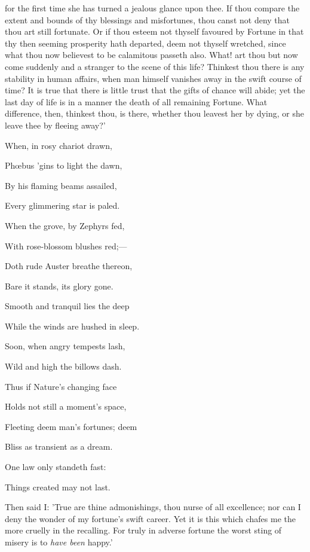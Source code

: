 for the first time she has turned a jealous glance upon thee. If thou
compare the extent and bounds of thy blessings and misfortunes, thou
canst not deny that thou art still fortunate. Or if thou esteem not
thyself favoured by Fortune in that thy then seeming prosperity hath
departed, deem not thyself wretched, since what thou now believest to be
calamitous passeth also. What! art thou but now come suddenly and a
stranger to the scene of this life? Thinkest thou there is any stability
in human affairs, when man himself vanishes away in the swift course of
time? It is true that there is little trust that the gifts of chance
will abide; yet the last day of life is in a manner the death of all
remaining Fortune. What difference, then, thinkest thou, is there,
whether thou leavest her by dying, or she leave thee by fleeing away?'


When, in rosy chariot drawn,

Phœbus 'gins to light the dawn,

By his flaming beams assailed,

Every glimmering star is paled.

When the grove, by Zephyrs fed,

With rose-blossom blushes red;—

Doth rude Auster breathe thereon,

Bare it stands, its glory gone.

Smooth and tranquil lies the deep

While the winds are hushed in sleep.

Soon, when angry tempests lash,

Wild and high the billows dash.

Thus if Nature's changing face

Holds not still a moment's space,

Fleeting deem man's fortunes; deem

Bliss as transient as a dream.

One law only standeth fast:

Things created may not last.


Then said I: 'True are thine admonishings, thou nurse of all excellence;
nor can I deny the wonder of my fortune's swift career. Yet it is this
which chafes me the more cruelly in the recalling. For truly in adverse
fortune the worst sting of misery is to \emph{have been} happy.'

